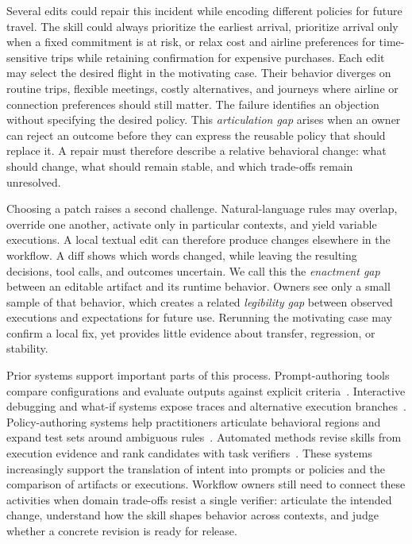 Several edits could repair this incident while encoding different policies for future travel. The skill could always prioritize the earliest arrival, prioritize arrival only when a fixed commitment is at risk, or relax cost and airline preferences for time-sensitive trips while retaining confirmation for expensive purchases. Each edit may select the desired flight in the motivating case. Their behavior diverges on routine trips, flexible meetings, costly alternatives, and journeys where airline or connection preferences should still matter. The failure identifies an objection without specifying the desired policy. This \emph{articulation gap} arises when an owner can reject an outcome before they can express the reusable policy that should replace it. A repair must therefore describe a relative behavioral change: what should change, what should remain stable, and which trade-offs remain unresolved.

Choosing a patch raises a second challenge. Natural-language rules may overlap, override one another, activate only in particular contexts, and yield variable executions. A local textual edit can therefore produce changes elsewhere in the workflow. A diff shows which words changed, while leaving the resulting decisions, tool calls, and outcomes uncertain. We call this the \emph{enactment gap} between an editable artifact and its runtime behavior. Owners see only a small sample of that behavior, which creates a related \emph{legibility gap} between observed executions and expectations for future use. Rerunning the motivating case may confirm a local fix, yet provides little evidence about transfer, regression, or stability.

Prior systems support important parts of this process. Prompt-authoring tools compare configurations and evaluate outputs against explicit criteria~\cite{arawjo2024chainforge,kim2024evallm}. Interactive debugging and what-if systems expose traces and alternative execution branches~\cite{epperson2025agdebugger,romerolauro2026rag}. Policy-authoring systems help practitioners articulate behavioral regions and expand test sets around ambiguous rules~\cite{lam2025policymaps,lee2026dataprompt}. Automated methods revise skills from execution evidence and rank candidates with task verifiers~\cite{liu2026skillrevise}. These systems increasingly support the translation of intent into prompts or policies and the comparison of artifacts or executions. Workflow owners still need to connect these activities when domain trade-offs resist a single verifier: articulate the intended change, understand how the skill shapes behavior across contexts, and judge whether a concrete revision is ready for release.

